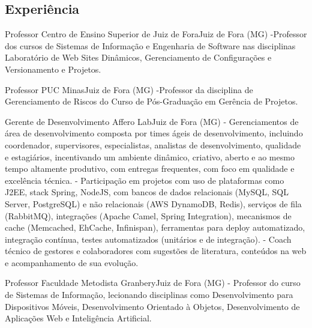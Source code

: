\documentclass[12pt, a4paper, sans]{moderncv}
\begin{document}
\makecvtitle


%
%

\subsection{Experiência}

{Professor}
{Centro de Ensino Superior de Juiz de Fora}{Juiz de Fora (MG)}{}
{ 
-Professor dos cursos de Sistemas de Informação e Engenharia de Software nas disciplinas Laboratório de Web Sites Dinâmicos, Gerenciamento de Configurações e Versionamento e Projetos.
}


{Professor}
{PUC Minas}{Juiz de Fora (MG)}{}
{ 
-Professor da disciplina de Gerenciamento de Riscos do Curso de Pós-Graduação em Gerência de Projetos.
}

{Gerente de Desenvolvimento}
{Affero Lab}{Juiz de Fora (MG)}{}
{
- Gerenciamentos de área de desenvolvimento composta por times ágeis de desenvolvimento, incluindo coordenador, supervisores, especialistas, analistas de desenvolvimento,  qualidade e estagiários, incentivando um ambiente dinâmico, criativo, aberto e ao mesmo tempo altamente produtivo, com entregas frequentes, com foco em qualidade e excelência técnica.\newline{}
- Participação em projetos com uso de plataformas como J2EE, stack Spring, NodeJS, com bancos de dados relacionais (MySQL, SQL Server, PostgreSQL) e não relacionais (AWS DynamoDB, Redis), serviços de fila (RabbitMQ), integrações (Apache Camel, Spring Integration), mecanismos de cache (Memcached, EhCache, Infinispan), ferramentas para deploy automatizado, integração contínua, testes automatizados (unitários e de integração).\newline{}
- Coach técnico de gestores e colaboradores com sugestões de literatura, conteúdos na web e acompanhamento de sua evolução.}

{Professor}
{Faculdade Metodista Granbery}{Juiz de Fora (MG)}{}
{
- Professor do curso de Sistemas de Informação, lecionando disciplinas como Desenvolvimento para Dispositivos Móveis, Desenvolvimento Orientado à Objetos, Desenvolvimento de Aplicações Web e Inteligência Artificial.}
\end{document}
